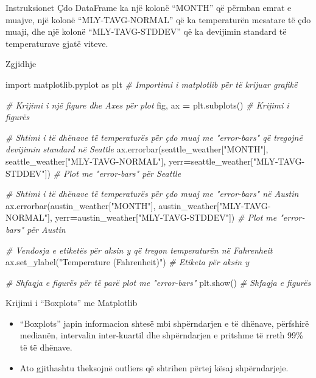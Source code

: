 \documentclass[
  ignorenonframetext,
]{beamer}
\newenvironment{Shaded}{\begin{snugshade}}{\end{snugshade}}
\newcommand{\CommentTok}[1]{\textcolor[rgb]{0.56,0.35,0.01}{\textit{#1}}}
\newcommand{\ImportTok}[1]{#1}
\newcommand{\NormalTok}[1]{#1}
\newcommand{\OperatorTok}[1]{\textcolor[rgb]{0.81,0.36,0.00}{\textbf{#1}}}
\newcommand{\StringTok}[1]{\textcolor[rgb]{0.31,0.60,0.02}{#1}}
\begin{document}
\begin{frame}{Instruksionet}
\protect\hypertarget{instruksionet-9}{}
Çdo DataFrame ka një kolonë ``MONTH'' që përmban emrat e muajve, një
kolonë ``MLY-TAVG-NORMAL'' që ka temperaturën mesatare të çdo muaji, dhe
një kolonë ``MLY-TAVG-STDDEV'' që ka devijimin standard të temperaturave
gjatë viteve.
\end{frame}

\begin{frame}[fragile]{Zgjidhje}
\protect\hypertarget{zgjidhje-8}{}

\begin{Shaded}
\begin{Highlighting}[]
\ImportTok{import}\NormalTok{ matplotlib.pyplot }\ImportTok{as}\NormalTok{ plt  }\CommentTok{\# Importimi i matplotlib për të krijuar grafikë}

\CommentTok{\# Krijimi i një figure dhe Axes për plot}
\NormalTok{fig, ax }\OperatorTok{=}\NormalTok{ plt.subplots()  }\CommentTok{\# Krijimi i figurës}

\CommentTok{\# Shtimi i të dhënave të temperaturës për çdo muaj me "error{-}bars" që tregojnë devijimin standard në Seattle}
\NormalTok{ax.errorbar(seattle\_weather[}\StringTok{"MONTH"}\NormalTok{], seattle\_weather[}\StringTok{"MLY{-}TAVG{-}NORMAL"}\NormalTok{], yerr}\OperatorTok{=}\NormalTok{seattle\_weather[}\StringTok{"MLY{-}TAVG{-}STDDEV"}\NormalTok{])  }\CommentTok{\# Plot me "error{-}bars" për Seattle}

\CommentTok{\# Shtimi i të dhënave të temperaturës për çdo muaj me "error{-}bars" në Austin}
\NormalTok{ax.errorbar(austin\_weather[}\StringTok{"MONTH"}\NormalTok{], austin\_weather[}\StringTok{"MLY{-}TAVG{-}NORMAL"}\NormalTok{], yerr}\OperatorTok{=}\NormalTok{austin\_weather[}\StringTok{"MLY{-}TAVG{-}STDDEV"}\NormalTok{])  }\CommentTok{\# Plot me "error{-}bars" për Austin}

\CommentTok{\# Vendosja e etiketës për aksin y që tregon temperaturën në Fahrenheit}
\NormalTok{ax.set\_ylabel(}\StringTok{"Temperature (Fahrenheit)"}\NormalTok{)  }\CommentTok{\# Etiketa për aksin y}

\CommentTok{\# Shfaqja e figurës për të parë plot me "error{-}bars"}
\NormalTok{plt.show()  }\CommentTok{\# Shfaqja e figurës}
\end{Highlighting}
\end{Shaded}
\end{frame}

\begin{frame}{Krijimi i ``Boxplots'' me Matplotlib}
\protect\hypertarget{krijimi-i-boxplots-me-matplotlib}{}
\begin{itemize}
\item
  ``Boxplots'' japin informacion shtesë mbi shpërndarjen e të dhënave,
  përfshirë medianën, intervalin inter-kuartil dhe shpërndarjen e
  pritshme të rreth 99\% të të dhënave.
\item
  Ato gjithashtu theksojnë outliers që shtrihen përtej kësaj
  shpërndarjeje.
\end{itemize}
\end{frame}
\end{document}
